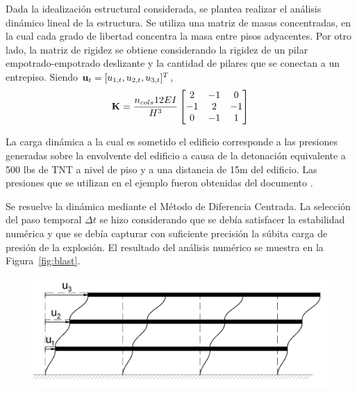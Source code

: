Dada la idealización estructural considerada, se plantea realizar el análisis dinámico lineal de la estructura. %
%
Se utiliza una matriz de masas concentradas, en la cual cada grado de libertad concentra la masa entre pisos adyacentes. Por otro lado, la matriz de rigidez se obtiene considerando la rigidez de un pilar empotrado-empotrado deslizante y la cantidad de pilares que se conectan a un entrepiso. Siendo ${\bf u}_t=[u_{1,t}, u_{2,t}, u_{3,t}]^T$,
%
\begin{equation}
{\bf K} = \frac{n_{cols} 12 E I }{H^3}
\left[\begin{matrix}
2 & -1 & 0 \\
-1 & 2 & -1 \\
0 & -1 & 1 \\
\end{matrix}
\right]
\end{equation}

La carga dinámica a la cual es sometido el edificio corresponde a las presiones generadas sobre la envolvente del edificio a causa de la detonación equivalente a 500 lbs de TNT a nivel de piso y a una distancia de 15m del edificio. Las presiones que se utilizan en el ejemplo fueron obtenidas del documento \citep{aisc2013guide26}.

Se resuelve la dinámica mediante el Método de Diferencia Centrada. La selección  del paso temporal $\Delta t$ se hizo considerando que se debía satisfacer la estabilidad numérica y que se debía capturar con suficiente precisión la súbita carga de presión de la explosión. %
%
El resultado del análisis numérico se muestra en la Figura~\ref{fig:blast}.



\begin{figure}[htb]
	\centering
	\includegraphics[width=.6\linewidth]{../fig/model3dof}
\end{figure}

